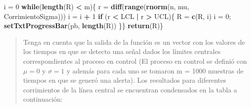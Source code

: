 \documentclass{article}
\newenvironment{Shaded}{\begin{snugshade}}{\end{snugshade}}
\newcommand{\ControlFlowTok}[1]{\textcolor[rgb]{0.13,0.29,0.53}{\textbf{#1}}}
\newcommand{\DecValTok}[1]{\textcolor[rgb]{0.00,0.00,0.81}{#1}}
\newcommand{\FunctionTok}[1]{\textcolor[rgb]{0.13,0.29,0.53}{\textbf{#1}}}
\newcommand{\NormalTok}[1]{#1}
\newcommand{\OtherTok}[1]{\textcolor[rgb]{0.56,0.35,0.01}{#1}}
\newcommand{\SpecialCharTok}[1]{\textcolor[rgb]{0.81,0.36,0.00}{\textbf{#1}}}
\begin{document}
\begin{Shaded}
\begin{Highlighting}[]
\NormalTok{  i }\OtherTok{=} \DecValTok{0}
  \ControlFlowTok{while}\NormalTok{(}\FunctionTok{length}\NormalTok{(R) }\SpecialCharTok{\textless{}}\NormalTok{ m)\{}
\NormalTok{    r }\OtherTok{=} \FunctionTok{diff}\NormalTok{(}\FunctionTok{range}\NormalTok{(}\FunctionTok{rnorm}\NormalTok{(n, mu, CorrimientoSigma)))}
\NormalTok{    i }\OtherTok{=}\NormalTok{ i }\SpecialCharTok{+} \DecValTok{1}
    \ControlFlowTok{if}\NormalTok{ (r }\SpecialCharTok{\textless{}}\NormalTok{ LCL }\SpecialCharTok{|}\NormalTok{ r }\SpecialCharTok{\textgreater{}}\NormalTok{ UCL)\{}
\NormalTok{      R }\OtherTok{=} \FunctionTok{c}\NormalTok{(R, i)}
\NormalTok{      i }\OtherTok{=} \DecValTok{0}\NormalTok{; }\FunctionTok{setTxtProgressBar}\NormalTok{(pb, }\FunctionTok{length}\NormalTok{(R))}
\NormalTok{    \}\}}
  \FunctionTok{return}\NormalTok{(R)\}}
\end{Highlighting}
\end{Shaded}

\normalsize

\begin{quote}
\small Tenga en cuenta que la salida de la función es un vector con los
valores de los tiempos en que se detecto una señal dados los límites
centrales correspondientes al proceso en control (El proceso en control
se definió con \(\mu = 0\) y \(\sigma = 1\) y además para cada uno se
tomaron m = 1000 muestras de tiempos en que se generó una alerta). Los
resultados para diferentes corrimientos de la línea central se
encuentran condensados en la tabla a continuación:
\end{quote}
\end{document}
